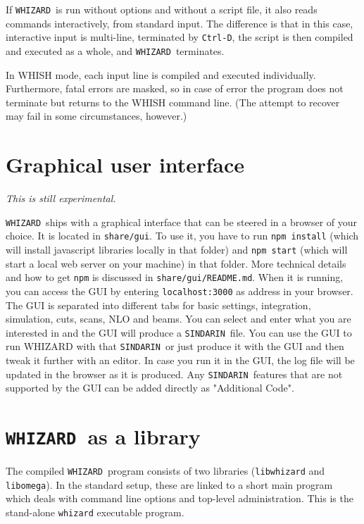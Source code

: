 \documentclass[12pt]{book}
\newcommand{\ttt}[1]{\texttt{#1}}
\newcommand{\whizard}{\ttt{WHIZARD}}
\newcommand{\sindarin}{\ttt{SINDARIN}}
\begin{document}
If \whizard\ is run without options and without a script file, it
also reads commands interactively, from standard input.  The
difference is that in this case, interactive input is multi-line,
terminated by \ttt{Ctrl-D}, the script is then compiled and
executed as a whole, and \whizard\ terminates.

In WHISH mode, each input line is compiled and executed individually.
Furthermore, fatal errors are masked, so in case of error the program
does not terminate but returns to the WHISH command line.  (The
attempt to recover may fail in some circumstances, however.)


\section{Graphical user interface}

\emph{This is still experimental.}

\whizard\ ships with a graphical interface that can be steered in a
browser of your choice. It is located in \ttt{share/gui}.  To use it,
you have to run \ttt{npm install} (which will install javascript
libraries locally in that folder) and \ttt{npm start} (which will start
a local web server on your machine) in that folder.  More technical
details and how to get \ttt{npm} is discussed in
\ttt{share/gui/README.md}.  When it is running, you can access the GUI
by entering \ttt{localhost:3000} as address in your browser.  The GUI is
separated into different tabs for basic settings, integration,
simulation, cuts, scans, NLO and beams.  You can select and enter what
you are interested in and the GUI will produce a \sindarin\ file.  You
can use the GUI to run WHIZARD with that \sindarin\ or just produce it
with the GUI and then tweak it further with an editor.  In case you run
it in the GUI, the log file will be updated in the browser as it is
produced.  Any \sindarin\ features that are not supported by the GUI can
be added directly as "Additional Code".

\section{\whizard\ as a library}

The compiled \whizard\ program consists of two libraries (\ttt{libwhizard} and
\ttt{libomega}).  In the standard setup, these are linked to a short main
program which deals with command line options and top-level administration.
This is the stand-alone \ttt{whizard} executable program.
\end{document}
